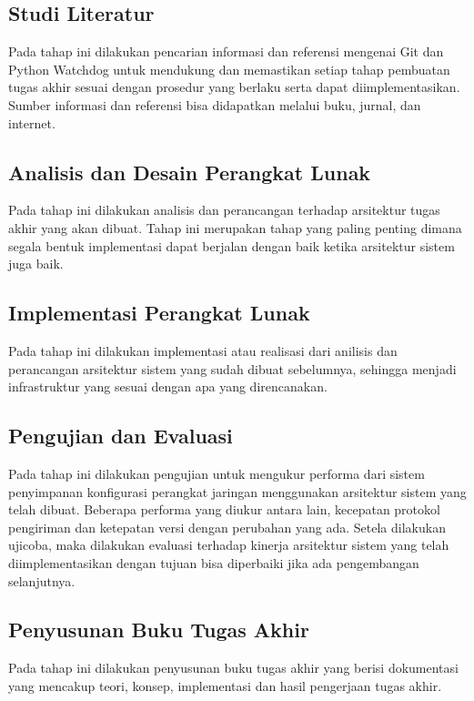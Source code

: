  		\subsection{Studi Literatur}
 			Pada tahap ini dilakukan pencarian informasi dan referensi mengenai Git dan Python Watchdog untuk mendukung dan memastikan setiap tahap pembuatan tugas akhir sesuai dengan prosedur yang berlaku serta dapat diimplementasikan. Sumber informasi dan referensi bisa didapatkan melalui buku, jurnal, dan internet.
 		\subsection{Analisis dan Desain Perangkat Lunak}
 			Pada tahap ini dilakukan analisis dan perancangan terhadap arsitektur tugas akhir yang akan dibuat. Tahap ini merupakan tahap yang paling penting dimana segala bentuk implementasi dapat berjalan dengan baik ketika arsitektur sistem juga baik. 
 		\subsection{Implementasi Perangkat Lunak}
 			Pada tahap ini dilakukan implementasi atau realisasi dari anilisis dan perancangan arsitektur sistem yang sudah dibuat sebelumnya, sehingga menjadi infrastruktur yang sesuai dengan apa yang direncanakan.
 		\subsection{Pengujian dan Evaluasi}
 			Pada tahap ini dilakukan pengujian untuk mengukur performa dari sistem penyimpanan konfigurasi perangkat jaringan menggunakan arsitektur sistem yang telah dibuat. Beberapa performa yang diukur antara lain, kecepatan protokol pengiriman dan ketepatan versi dengan perubahan yang ada. Setela dilakukan ujicoba, maka dilakukan evaluasi terhadap kinerja arsitektur sistem yang telah diimplementasikan dengan tujuan bisa diperbaiki jika ada pengembangan selanjutnya.
 		\subsection{Penyusunan Buku Tugas Akhir}
 			Pada tahap ini dilakukan penyusunan buku tugas akhir yang berisi dokumentasi yang mencakup teori, konsep, implementasi dan hasil pengerjaan tugas akhir.
 			
